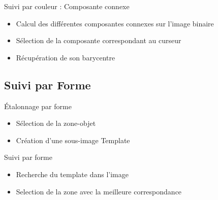 \documentclass{beamer}
\begin{document}
		\begin{frame}{Suivi par couleur : Composante connexe}
			\begin{itemize}
				\item{Calcul des différentes composantes connexes sur l'image binaire}
				\item{Sélection de la composante correspondant au curseur}
				\item{Récupération de son barycentre} 
			\end{itemize}
		\end{frame}

		\subsection{Suivi par Forme}
		\begin{frame}{Étalonnage par forme}
			\begin{itemize}
				\item{Sélection de la zone-objet}
				\item{Création d'une sous-image Template}
			\end{itemize}
		\end{frame}

		\begin{frame}{Suivi par forme}
			\begin{itemize}
				\item{Recherche du template dans l'image}
				\item{Selection de la zone avec la meilleure correspondance}
			\end{itemize}
		\end{frame}
\end{document}
